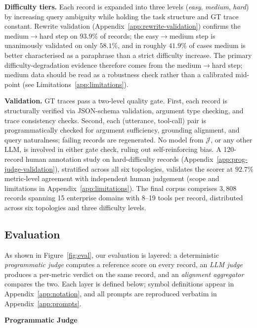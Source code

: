 \noindent\textbf{Difficulty tiers.} Each record is expanded into three levels (\textit{easy}, \textit{medium}, \textit{hard}) by increasing query ambiguity while holding the task structure and GT trace constant. Rewrite validation (Appendix~\ref{app:rewrite-validation}) confirms the medium$\to$hard step on $93.9\%$ of records; the easy$\to$medium step is unanimously validated on only $58.1\%$, and in roughly $41.9\%$ of cases medium is better characterised as a paraphrase than a strict difficulty increase. The primary difficulty-degradation evidence therefore comes from the medium$\to$hard step; medium data should be read as a robustness check rather than a calibrated mid-point (see Limitations~\ref{app:limitations}).

\noindent\textbf{Validation.} GT traces pass a two-level quality gate. First, each record is structurally verified via JSON-schema validation, argument type checking, and trace consistency checks. Second, each (utterance, tool-call) pair is programmatically checked for argument sufficiency, grounding alignment, and query naturalness; failing records are regenerated. No model from $\mathcal{J}$, or any other LLM, is involved in either gate check, ruling out self-reinforcing bias. A 120-record human annotation study on hard-difficulty records (Appendix~\ref{app:prog-judge-validation}), stratified across all six topologies, validates the scorer at $92.7\%$ metric-level agreement with independent human judgement (scope and limitations in Appendix~\ref{app:limitations}). The final corpus comprises $3{,}808$ records spanning 15 enterprise domains with 8--19 tools per record, distributed across six topologies and three difficulty levels.

\vspace{-0.4cm}
\subsection{Evaluation}
\label{sec:methodology:eval}
\vspace{-0.3cm}
As shown in Figure~\ref{fig:eval}, our evaluation is layered: a deterministic \emph{programmatic judge} computes a reference score on every record, an \emph{LLM judge} produces a per-metric verdict on the same record, and an \emph{alignment aggregator} compares the two. Each layer is defined below; symbol definitions appear in Appendix~\ref{app:notation}, and all prompts are reproduced verbatim in Appendix~\ref{app:prompts}.

\noindent\textbf{Programmatic Judge}
\label{sec:methodology:programmatic}

